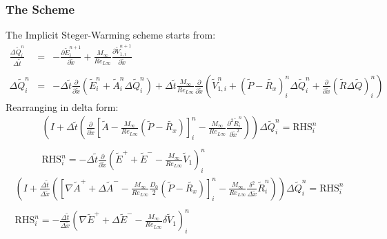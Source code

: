 \documentclass[11pt, a4paper]{article}
\newcommand{\parder}[2]{\frac{\partial {#1}}{\partial {#2}}}
\begin{document}
\subsubsection{The Scheme}
The Implicit Steger-Warming scheme starts from:
\begin{equation}
    \begin{array}{lcl}
        \displaystyle\frac{\Delta\tilde{Q}_i^n}{\Delta\tilde{t}} & = & \displaystyle-\parder{\tilde{E}_i^{n+1}}{\tilde{x}}+\frac{M_\infty}{Re_{L\infty}}\parder{\tilde{V}_{1,i}^{n+1}}{\tilde{x}} \\\\
        \displaystyle\Delta\tilde{Q}_i^n & = & \displaystyle-\Delta\tilde{t}\parder{}{\tilde{x}}\left(\tilde{E}_i^{n}+\tilde{A}_i^n\Delta\tilde{Q}_i^n\right)+\Delta\tilde{t}\frac{M_\infty}{Re_{L\infty}}\parder{}{\tilde{x}}\left(\tilde{V}_{1,i}^{n}+\left(\tilde{P}-\tilde{R_x}\right)_i^n\Delta\tilde{Q}_i^n+\parder{}{\tilde{x}}\left(\tilde{R}\Delta\tilde{Q}\right)_i^n\right)
    \end{array}
\end{equation}
Rearranging in delta form:
\begin{equation}
    \begin{array}{c}
        \displaystyle\left(I+\Delta\tilde{t}\left(\parder{}{\tilde{x}}\left[\tilde{A}-\frac{M_\infty}{Re_{L\infty}}\left(\tilde{P}-\tilde{R_x}\right)\right]_i^n-\frac{M_\infty}{Re_{L\infty}}\frac{\partial^2\tilde{R}_i^n}{\partial\tilde{x}^2}\right)\right)\Delta\tilde{Q}_i^n=\mathrm{RHS}_i^n \\\\
        \mathrm{RHS}_i^n=\displaystyle-\Delta\tilde{t}\parder{}{\tilde{x}}\left(\tilde{E}^{+}+\tilde{E}^{-}-\frac{M_\infty}{Re_{L\infty}}\tilde{V}_{1}\right)_i^n
    \end{array}
\end{equation}
\begin{equation}
    \begin{array}{c}
        \displaystyle\left(I+\frac{\Delta\tilde{t}}{\Delta\tilde{x}}\left(\left[\nabla\tilde{A}^{+}+\Delta\tilde{A}^{-}-\frac{M_\infty}{Re_{L\infty}}\frac{D_0}{2}\left(\tilde{P}-\tilde{R_x}\right)\right]_i^n-\frac{M_\infty}{Re_{L\infty}}\frac{\delta^2}{\Delta\tilde{x}}\tilde{R}_i^n\right)\right)\Delta\tilde{Q}_i^n=\mathrm{RHS}_i^n \\\\
        \mathrm{RHS}_i^n=\displaystyle-\frac{\Delta\tilde{t}}{\Delta\tilde{x}}\left(\nabla\tilde{E}^{+}+\Delta\tilde{E}^{-}-\frac{M_\infty}{Re_{L\infty}}\delta\tilde{V}_{1}\right)_i^n
    \end{array}
\end{equation}
\end{document}
